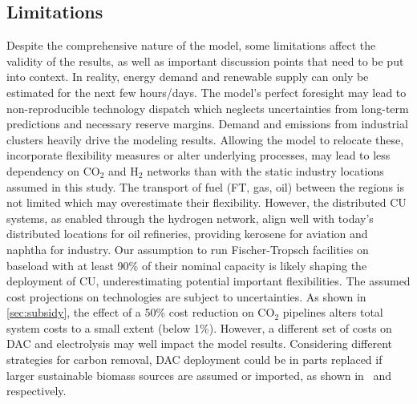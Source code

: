 \documentclass[twocolumn]{article}
\newcommand{\carbon}{CO$_2$}
\newcommand{\hydrogen}{H$_2$}
\begin{document}
\subsection{Limitations}
\label{sec:limitations}
Despite the comprehensive nature of the model, some limitations affect the validity of the results, as well as important discussion points that need to be put into context.
In reality, energy demand and renewable supply can only be estimated for the next few hours/days. The model's perfect foresight may lead to non-reproducible technology dispatch which neglects uncertainties from long-term predictions and necessary reserve margins.
Demand and emissions from industrial clusters heavily drive the modeling results. Allowing the model to relocate these, incorporate flexibility measures or alter underlying processes, may lead to less dependency on \carbon{} and \hydrogen{} networks than with the static industry locations assumed in this study.
The transport of fuel (FT, gas, oil) between the regions is not limited which may overestimate their flexibility. However, the distributed CU systems, as enabled through the hydrogen network, align well with today's distributed locations for oil refineries, providing kerosene for aviation and naphtha for industry. Our assumption to run Fischer-Tropsch facilities on baseload with at least 90\% of their nominal capacity is likely shaping the deployment of CU, underestimating potential important flexibilities.
The assumed cost projections on technologies are subject to uncertainties. As shown in \ref{sec:subsidy}, the effect of a 50\% cost reduction on \carbon{} pipelines alters total system costs to a small extent (below 1\%). However, a different set of costs on DAC and electrolysis may well impact the model results.
Considering different strategies for carbon removal, DAC deployment could be in parts replaced if larger sustainable biomass sources are assumed or imported, as shown in~\cite{lauerCrucialRoleBioenergy2023} and~\cite{millingerDiversityBiomassUsage2023} respectively.
\end{document}

